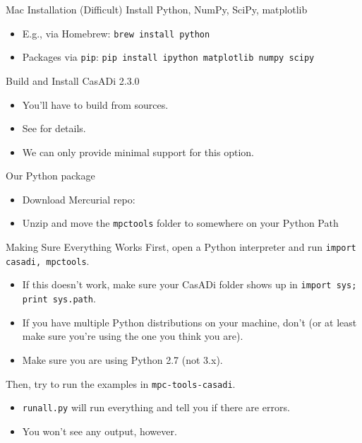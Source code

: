 \documentclass[xcolor=dvipsnames]{beamer}
\begin{document}
\begin{frame}{Mac Installation (Difficult)}
       Install Python, NumPy, SciPy, matplotlib
       \begin{itemize}
           \item E.g., via Homebrew: \lstinline[style=shell]!brew install python!
           \item Packages via \texttt{pip}: \lstinline[style=shell]!pip install ipython matplotlib numpy scipy
           !
        \end{itemize}
        
        \medskip
        
        Build and Install CasADi 2.3.0
        \begin{itemize}
            \item You'll have to build from sources.
            \item See  for details.
            \item We can only provide minimal support for this option.
        \end{itemize}
        
        \medskip
        
        Our Python package
        \begin{itemize}
            \item Download Mercurial repo: 
            \item Unzip and move the \texttt{mpctools} folder to somewhere on your Python Path
        \end{itemize}
\end{frame}

\begin{frame}{Making Sure Everything Works}
    First, open a Python interpreter and run \lstinline[style=python]!import casadi, mpctools!.
    \begin{itemize}
        \item If this doesn't work, make sure your CasADi folder shows up in \lstinline[style=python]!import sys; print sys.path!.
        \item If you have multiple Python distributions on your machine, don't (or at least make sure you're using the one you think you are).
        \item Make sure you are using Python 2.7 (not 3.x).
    \end{itemize}
        
    Then, try to run the examples in \texttt{mpc-tools-casadi}.
    \begin{itemize}
        \item \texttt{runall.py} will run everything and tell you if there are errors.
        \item You won't see any output, however.
    \end{itemize}
\end{frame}
\end{document}

